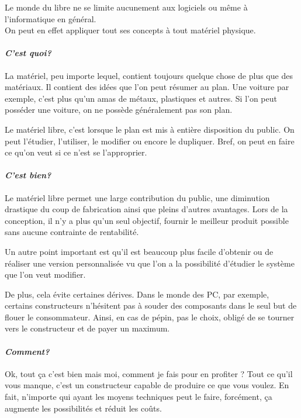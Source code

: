 \documentclass[12pt]{../fiche}
\begin{document}

Le monde du libre ne se limite aucunement aux logiciels ou même à l'informatique en général.\\
On peut en effet appliquer tout ses concepts à tout matériel physique.

\paragraph{\textit{C'est quoi?}}
La matériel, peu importe lequel, contient toujours quelque chose de plus que des matériaux. Il contient des idées que l'on peut résumer au plan. Une voiture par exemple, c'est plus qu'un amas de métaux, plastiques et autres. Si l'on peut posséder une voiture, on ne possède généralement pas son plan.

Le matériel libre, c'est lorsque le plan est mis à entière disposition du public. On peut l'étudier, l'utiliser, le modifier ou encore le dupliquer. Bref, on peut en faire ce qu'on veut si ce n'est se l'approprier.

\paragraph{\textit{C'est bien?}}
Le matériel libre permet une large contribution du public, une diminution drastique du coup de fabrication ainsi que pleins d'autres avantages. Lors de la conception, il n'y a plus qu'un seul objectif, fournir le meilleur produit possible sans aucune contrainte de rentabilité.

Un autre point important est qu'il est beaucoup plus facile d'obtenir ou de réaliser une version personnalisée vu que l'on a la possibilité d'étudier le système que l'on veut modifier.

De plus, cela évite certaines dérives. Dans le monde des PC, par exemple, certains constructeurs n'hésitent pas à souder des composants dans le seul but de flouer le consommateur. Ainsi, en cas de pépin, pas le choix, obligé de se tourner vers le constructeur et de payer un maximum.

\paragraph{\textit{Comment?}}
Ok, tout ça c'est bien mais moi, comment je fais pour en profiter ? Tout ce qu'il vous manque, c'est un constructeur capable de produire ce que vous voulez. En fait, n'importe qui ayant les moyens techniques peut le faire, forcément, ça augmente les possibilités et réduit les coûts.
\end{document}
